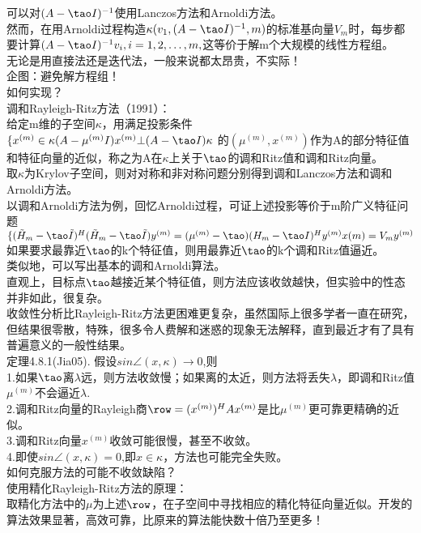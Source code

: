 \documentclass[a4paper,12pt]{article}
\begin{document}
\begin{CJK*}{UTF8}{gbsn}
	可以对$(A-\tao I)^{-1}$使用Lanczos方法和Arnoldi方法。\\
	然而，在用Arnoldi过程构造$\kappa(v_1,(A-\tao I)^{-1},m)$的标准基向量$V_m$时，每步都要计算$(A-\tao I)^{-1}v_i,i=1,2,\ldots,m,$这等价于解m个大规模的线性方程组。\\
	无论是用直接法还是迭代法，一般来说都太昂贵，不实际！\\
	企图：避免解方程组！\\
	如何实现？\\
	调和Rayleigh-Ritz方法（1991）：\\
	给定m维的子空间$\kappa$，用满足投影条件\\
	$\{ x^{(m)} \in \kappa
	(A-\mu^{(m)}I)x^{(m)} \bot (A-\tao I)\kappa $
	的$(\mu^{(m)},x^{(m)})$作为A的部分特征值和特征向量的近似，称之为A在$\kappa$上关于$\tao$的调和Ritz值和调和Ritz向量。\\
	取$\kappa$为Krylov子空间，则对对称和非对称问题分别得到调和Lanczos方法和调和Arnoldi方法。\\
	以调和Arnoldi方法为例，回忆Arnoldi过程，可证上述投影等价于m阶广义特征问题
	$\{(\tilde{H}_m - \tao \tilde{I})^H(\tilde{H}_m - \tao\tilde{I})y^{(m)} = (\mu^{(m)} - \tao)(H_m - \tao I)^Hy^{(m)}
	x(m) = V_my^{(m)}$
	如果要求最靠近$\tao$的k个特征值，则用最靠近$\tao$的k个调和Ritz值逼近。\\
	类似地，可以写出基本的调和Arnoldi算法。\\
	直观上，目标点$\tao$越接近某个特征值，则方法应该收敛越快，但实验中的性态并非如此，很复杂。\\
	收敛性分析比Rayleigh-Ritz方法更困难更复杂，虽然国际上很多学者一直在研究，但结果很零散，特殊，很多令人费解和迷惑的现象无法解释，直到最近才有了具有普遍意义的一般性结果。\\
	定理4.8.1(Jia05). 假设$sin\angle(x,\kappa)\rightarrow 0$,则\\
	1.如果$\tao$离$\lambda$远，则方法收敛慢；如果离的太近，则方法将丢失$\lambda$，即调和Ritz值$\mu^{(m)}$不会逼近$\lambda$.\\
	2.调和Ritz向量的Rayleigh商$\row = (x^{(m)})^HAx^{(m)}$是比$\mu^{(m)}$更可靠更精确的近似。\\
	3.调和Ritz向量$x^{(m)}$收敛可能很慢，甚至不收敛。\\
	4.即使$sin\angle(x,\kappa)=0$,即$x\in \kappa$，方法也可能完全失败。\\
	如何克服方法的可能不收敛缺陷？\\
	使用精化Rayleigh-Ritz方法的原理：\\
	取精化方法中的$\mu$为上述$\row$，在子空间中寻找相应的精化特征向量近似。开发的算法效果显著，高效可靠，比原来的算法能快数十倍乃至更多！\\

\end{CJK*}
\end{document}
